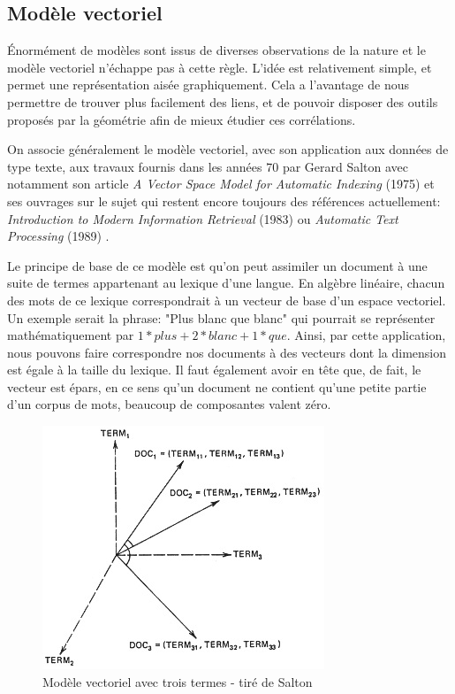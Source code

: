 \subsection{Modèle vectoriel}

Énormément de modèles sont issus de diverses observations de la nature et le modèle vectoriel n'échappe pas à cette règle. L'idée est relativement simple, et permet une représentation aisée graphiquement. Cela a l'avantage de nous permettre de trouver plus facilement des liens, et de pouvoir disposer des outils proposés par la géométrie afin de mieux étudier ces corrélations.

On associe généralement le modèle vectoriel, avec son application aux données de type texte, aux travaux fournis dans les années 70 par Gerard Salton avec notamment son article \textit{A Vector Space Model for Automatic Indexing} (1975) \cite{Salton1975} et ses ouvrages sur le sujet qui restent encore toujours des références actuellement: \textit{Introduction to Modern Information Retrieval} (1983) \cite{salton1986introduction} ou \textit{Automatic Text Processing} (1989) \cite{salton1989automatic}.

Le principe de base de ce modèle est qu'on peut assimiler un document à une suite de termes appartenant au lexique d'une langue. En algèbre linéaire, chacun des mots de ce lexique correspondrait à un vecteur de base d'un espace vectoriel. Un exemple serait la phrase: "Plus blanc que blanc" qui pourrait se représenter mathématiquement par $1 * plus + 2 * blanc + 1 * que$. Ainsi, par cette application, nous pouvons faire correspondre nos documents à des vecteurs dont la dimension est égale à la taille du lexique. Il faut également avoir en tête que, de fait, le vecteur est épars, en ce sens qu'un document ne contient qu'une petite partie d'un corpus de mots, beaucoup de composantes valent zéro.

\begin{figure}[h]
\begin{center}
  \centering
    \includegraphics[scale=0.75]{Methodologie/vspace.jpg}
    \caption{Modèle vectoriel avec trois termes - tiré de Salton}
\end{center}
\end{figure}

